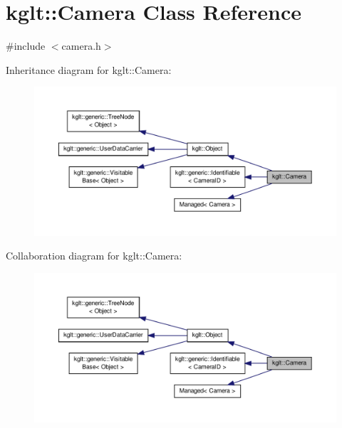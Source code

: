 \hypertarget{classkglt_1_1_camera}{\section{kglt\-:\-:Camera Class Reference}
\label{classkglt_1_1_camera}
}


{\ttfamily \#include $<$camera.\-h$>$}



Inheritance diagram for kglt\-:\-:Camera\-:\nopagebreak
\begin{figure}[H]
\begin{center}
\leavevmode
\includegraphics[width=350pt]{classkglt_1_1_camera__inherit__graph}
\end{center}
\end{figure}


Collaboration diagram for kglt\-:\-:Camera\-:\nopagebreak
\begin{figure}[H]
\begin{center}
\leavevmode
\includegraphics[width=350pt]{classkglt_1_1_camera__coll__graph}
\end{center}
\end{figure}
